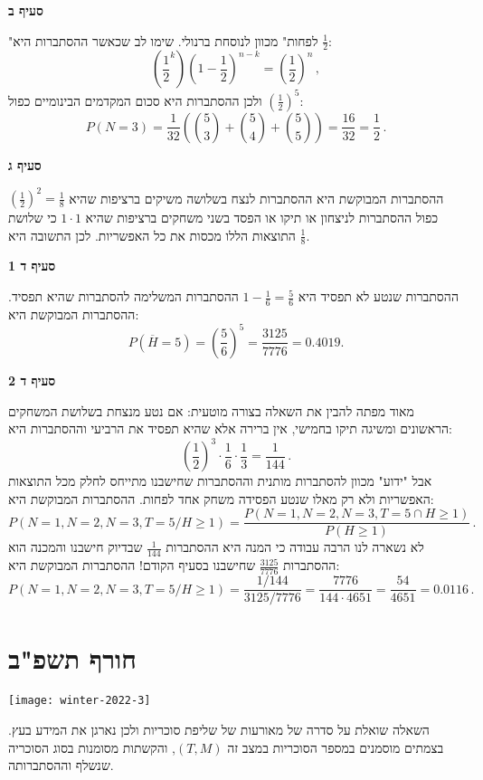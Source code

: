 \textbf{סעיף ב}

"לפחות" מכוון לנוסחת ברנולי. שימו לב שכאשר ההסתברות היא 
$\frac{1}{2}$:
\[
\left(\frac{1}{2}^k\right)\left(1-\frac{1}{2}\right)^{n-k}=\left(\frac{1}{2}\right)^n\,,
\]
ולכן ההסתברות היא סכום המקדמים הבינומיים כפול 
$\left(\frac{1}{2}\right)^5$:
\[
P(N=3)=\frac{1}{32}\left({5\choose 3}+{5\choose 4}+{5\choose 5}\right)=\frac{16}{32}=\frac{1}{2}\,.
\]

\textbf{סעיף ג}

ההסתברות המבוקשת היא ההסתברות לנצח בשלושה משיקים ברציפות שהיא
$\left(\frac{1}{2}\right)^2=\frac{1}{8}$
כפול ההסתברות לניצחון או תיקו או הפסד בשני משחקים ברציפות שהיא
$1\cdot 1$
כי שלושת התוצאות הללו מכסות את כל האפשריות. לכן התשובה היא
$\frac{1}{8}$.

\textbf{סעיף ד 1}

ההסתברות שנטע לא תפסיד היא
$1-\frac{1}{6}=\frac{5}{6}$
ההסתברות המשלימה להסתברות שהיא תפסיד. ההסתברות המבוקשת היא:
\[
P(\overline{H}=5)=\left(\frac{5}{6}\right)^5=\frac{3125}{7776}=0.4019.
\]

\textbf{סעיף ד 2}

מאוד מפתה להבין את השאלה בצורה מוטעית: אם נטע מנצחת בשלושת המשחקים הראשונים ומשיגה תיקו בחמישי, אין ברירה אלא שהיא תפסיד את הרביעי וההסתברות היא:
\[
\left(\frac{1}{2}\right)^3\cdot \frac{1}{6}\cdot \frac{1}{3}=\frac{1}{144}\,.
\]
אבל "ידוע" מכוון להסתברות מותנית וההסתברות שחישבנו מתייחס לחלק מכל התוצאות האפשריות ולא רק מאלו שנטע הפסידה משחק אחד לפחות. ההסתברות המבוקשת היא:
\[
P(N=1,N=2,N=3,T=5/H\geq 1)=\frac{P(N=1,N=2,N=3,T=5\cap H\geq 1)}{P(H\geq 1)}\,.
\]
לא נשארה לנו הרבה עבודה כי המנה היא ההסתברות
$\frac{1}{144}$
שבדיוק חישבנו והמכנה הוא ההסתברות
$\frac{3125}{7776}$
שחישבנו בסעיף הקודם! ההסתברות המבוקשת היא:
\[
P(N=1,N=2,N=3,T=5/H\geq 1)=\frac{1/144}{3125/7776}=
\frac{7776}{144\cdot 4651}=\frac{54}{4651}=0.0116\,.
\]


\newpage

\section{חורף תשפ"ב}

\begin{center}
\texttt{[image: winter-2022-3]}
\end{center}

השאלה שואלת על סדרה של מאורעות של שליפת סוכריות ולכן נארגן את המידע בעץ. בצמתים מוסמנים במספר הסוכריות במצב זה
$(T, M)$,
והקשתות מסומנות בסוג הסוכריה שנשלף וההסתברותה.

